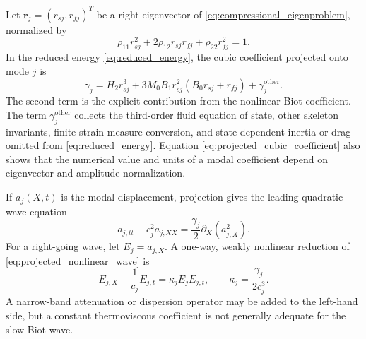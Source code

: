 \documentclass[11pt]{article}
\newcommand{\mbf}[1]{\mathbf{#1}}
\begin{document}
Let \(\mbf r_j=(r_{sj},r_{fj})^T\) be a right eigenvector of
\eqref{eq:compressional_eigenproblem}, normalized by
\begin{equation}
    \rho_{11}r_{sj}^2+2\rho_{12}r_{sj}r_{fj}
    +\rho_{22}r_{fj}^2=1.
    \label{eq:mode_normalization}
\end{equation}
In the reduced energy
\eqref{eq:reduced_energy}, the cubic coefficient projected onto mode \(j\) is
\begin{equation}
    \gamma_j
    =H_2r_{sj}^3
    +3M_0B_1r_{sj}^2
    \left(B_0r_{sj}+r_{fj}\right)
    +\gamma_j^{\mathrm{other}}.
    \label{eq:projected_cubic_coefficient}
\end{equation}
The second term is the explicit contribution from the nonlinear Biot
coefficient.  The term \(\gamma_j^{\mathrm{other}}\) collects the third-order
fluid equation of state, other skeleton invariants, finite-strain measure
conversion, and state-dependent inertia or drag omitted from
\eqref{eq:reduced_energy}.  Equation
\eqref{eq:projected_cubic_coefficient} also shows that the numerical value and
units of a modal coefficient depend on eigenvector and amplitude normalization.

If \(a_j(X,t)\) is the modal displacement, projection gives the leading
quadratic wave equation
\begin{equation}
    a_{j,tt}-c_j^2a_{j,XX}
    =\frac{\gamma_j}{2}
    \partial_X\left(a_{j,X}^2\right).
    \label{eq:projected_nonlinear_wave}
\end{equation}
For a right-going wave, let \(E_j=a_{j,X}\).  A one-way, weakly nonlinear
reduction of \eqref{eq:projected_nonlinear_wave} is
\begin{equation}
    E_{j,X}+\frac{1}{c_j}E_{j,t}
    =\kappa_j E_jE_{j,t},
    \qquad
    \kappa_j=\frac{\gamma_j}{2c_j^3}.
    \label{eq:modal_burgers}
\end{equation}
A narrow-band attenuation or dispersion operator may be added to the left-hand
side, but a constant thermoviscous coefficient is not generally adequate for
the slow Biot wave.
\end{document}
